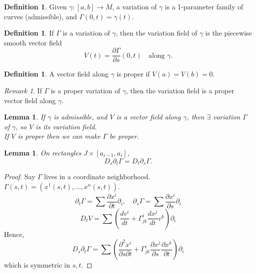 \documentclass[11pt, a4paper]{article}
\theoremstyle{plain}
\newtheorem{lemma}[theorem]{Lemma}
\theoremstyle{definition}
\newtheorem{definition}[theorem]{Definition}
\theoremstyle{remark}
\newtheorem{remark}[theorem]{Remark}
\begin{document}
\begin{definition}
Given $\gamma: [a, b] \to M$, a variation of $\gamma$ is a 1-parameter family of curves (admissible), and $\Gamma(0, t) = \gamma(t)$.
\end{definition}

\begin{definition}
If $\Gamma$ is a variation of $\gamma$, then the variation field of $\gamma$ is the piecewise smooth vector field 
\[ V(t) = \frac{\partial \Gamma}{\partial s}(0, t) \quad \text{along } \gamma. \]
\end{definition}

\begin{definition}
A vector field along $\gamma$ is proper if $V(a) = V(b) = 0$.
\end{definition}

\begin{remark}
If $\Gamma$ is a proper variation of $\gamma$, then the variation field is a proper vector field along $\gamma$.
\end{remark}

\begin{lemma}
If $\gamma$ is admissible, and $V$ is a vector field along $\gamma$, then $\exists$ variation $\Gamma$ of $\gamma$, so $V$ is its variation field. \\
If $V$ is proper then we can make $\Gamma$ be proper.
\end{lemma}

\begin{lemma}
On rectangles $J \times [a_{i-1}, a_i]$,
\[ D_s \partial_t \Gamma = D_t \partial_s \Gamma. \]
\end{lemma}

\begin{proof}
Say $\Gamma$ lives in a coordinate neighborhood. $\Gamma(s, t) = (x^1(s, t), \dots, x^n(s, t))$.
\[ \partial_t \Gamma = \sum \frac{\partial x^i}{\partial t} \partial_i, \quad \partial_s \Gamma = \sum \frac{\partial x^i}{\partial s} \partial_i \]
\[ D_t V = \sum \left( \frac{dv^i}{dt} + \Gamma_{jk}^i \frac{dx^j}{dt} v^k \right) \partial_i \]
Hence,
\[ D_s \partial_t \Gamma = \sum \left( \frac{\partial^2 x^i}{\partial s \partial t} + \Gamma_{jk}^i \frac{\partial x^j}{\partial s} \frac{\partial x^k}{\partial t} \right) \partial_i \]
which is symmetric in $s, t$.
\end{proof}
\newpage
\end{document}
